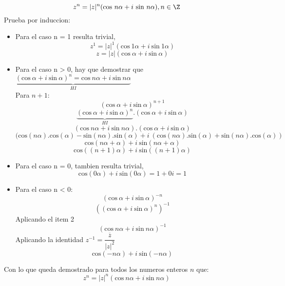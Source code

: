 \documentclass[10pt]{article}
\begin{document}
\newpage
\begin{prf}{}
	$$z^n = |z|^n (\text{cos}\ n\alpha + i\ \text{sin}\ n\alpha), n \in \Z$$
	Prueba por induccion:\\
	\begin{itemize}

	\item Para el caso n = 1 resulta trivial,
	$$ z^1 = |z|^1 (\text{cos}\ 1\alpha + i\ \text{sin}\ 1\alpha) $$
	$$ z = |z| (\text{cos}\ \alpha + i\ \text{sin}\ \alpha)$$

	\item Para el caso n > 0, hay que demostrar que $\underbrace{(\text{cos}\ \alpha + i\ \text{sin}\ \alpha)^n = \text{cos}\ n\alpha + i\ \text{sin}\ n\alpha}_{HI}$\\
	Para $n+1$:
	$$ (\text{cos}\ \alpha + i\ \text{sin}\ \alpha)^{n+1} $$
	$$ \underbrace{(\text{cos}\ \alpha + i\ \text{sin}\ \alpha)^n}_{HI} . (\text{cos}\ \alpha + i\ \text{sin}\ \alpha) $$
	$$ (\text{cos}\ n\alpha + i\ \text{sin}\ n\alpha) . (\text{cos}\ \alpha + i\ \text{sin}\ \alpha) $$
	$$ (\text{cos}(n\alpha).\text{cos}(\alpha) - \text{sin}(n\alpha).\text{sin}(\alpha) + i\ (\text{cos}(n\alpha).\text{sin}(\alpha) + \text{sin}(n\alpha).\text{cos}(\alpha)) $$
	$$ \text{cos}(n\alpha + \alpha) + i\ \text{sin}(n\alpha + \alpha) $$
	$$ \text{cos}((n + 1)\alpha) + i\ \text{sin}((n + 1)\alpha) $$

	\item Para el caso n = 0, tambien resulta trivial,
	$$ \text{cos}(0\alpha) + i\ \text{sin}(0\alpha) = 1 + 0i = 1 $$

	\item Para el caso n < 0:
	$$ (\text{cos}\ \alpha + i\ \text{sin}\ \alpha)^{-n} $$
	$$ \left((\text{cos}\ \alpha + i\ \text{sin}\ \alpha)^n\right)^{-1} $$
	\hfill Aplicando el item 2
	$$ (\text{cos}\ n\alpha + i\ \text{sin}\ n\alpha)^{-1} $$
	\hfill Aplicando la identidad $z^{-1} = \dfrac{\overline{z}}{|z|^2}$
	$$ \text{cos}(-n\alpha) + i\ \text{sin}(-n\alpha) $$
	\end{itemize}
	Con lo que queda demostrado para todos los numeros enteros $n$ que:
	$$z^n = |z|^n (\text{cos}\ n\alpha + i\ \text{sin}\ n\alpha)$$
\end{prf}
\end{document}

